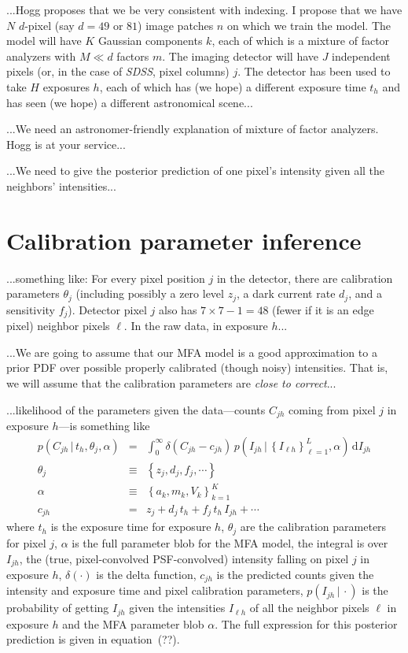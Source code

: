 \documentclass[12pt]{article}
\newcommand{\equationname}{equation}
\newcommand{\project}[1]{\textsl{#1}}
\newcommand{\given}{\,|\,}
\newcommand{\setofall}[1]{\left\{{#1}\right\}}
\newcommand{\dd}{\mathrm{d}}
\begin{document}
...Hogg proposes that we be very consistent with indexing.  I propose
that we have $N$ $d$-pixel (say $d=49$ or $81$) image patches $n$ on
which we train the model.  The model will have $K$ Gaussian components
$k$, each of which is a mixture of factor analyzers with $M\ll d$
factors $m$.  The imaging detector will have $J$ independent pixels
(or, in the case of \project{SDSS}, pixel columns) $j$.  The detector
has been used to take $H$ exposures $h$, each of which has (we hope) a
different exposure time $t_h$ and has seen (we hope) a different
astronomical scene...

...We need an astronomer-friendly explanation of mixture of factor
analyzers.  Hogg is at your service...

...We need to give the posterior prediction of one pixel's intensity
given all the neighbors' intensities...

\section{Calibration parameter inference}

...something like: For every pixel position $j$ in the detector, there
are calibration parameters $\theta_j$ (including possibly a zero level
$z_j$, a dark current rate $d_j$, and a sensitivity $f_j$).  Detector
pixel $j$ also has $7\times 7-1=48$ (fewer if it is an edge pixel)
neighbor pixels $\ell$.  In the raw data, in exposure $h$...

...We are going to assume that our MFA model is a good approximation
to a prior PDF over possible properly calibrated (though noisy)
intensities.  That is, we will assume that the calibration parameters
are \emph{close to correct}...

...likelihood of the parameters given the data---counts $C_{jh}$
coming from pixel $j$ in exposure $h$---is something like
\begin{eqnarray}
p(C_{jh}\given t_h,\theta_j,\alpha) &=& \int_0^\infty \delta(C_{jh} - c_{jh})\,p(I_{jh}\given\setofall{I_{\ell h}}_{\ell=1}^L,\alpha)\,\dd I_{jh}
\label{eq:calibration}\\
\theta_j &\equiv& \setofall{z_j, d_j, f_j, \cdots}
\\
\alpha &\equiv& \setofall{a_k,m_k,V_k}_{k=1}^K
\\
c_{jh} &=& z_j + d_j\,t_h + f_j\,t_h\,I_{jh} + \cdots
\end{eqnarray}
where $t_h$ is the exposure time for exposure $h$, $\theta_j$ are the
calibration parameters for pixel $j$, $\alpha$ is the full parameter
blob for the MFA model, the integral is over $I_{jh}$, the (true,
pixel-convolved PSF-convolved) intensity falling on pixel $j$ in
exposure $h$, $\delta(\cdot)$ is the delta function, $c_{jh}$ is the
predicted counts given the intensity and exposure time and pixel
calibration parameters, $p(I_{jh}\given\cdot)$ is the probability of
getting $I_{jh}$ given the intensities $I_{\ell h}$ of all the
neighbor pixels $\ell$ in exposure $h$ and the MFA parameter blob
$\alpha$.  The full expression for this posterior prediction is given
in \equationname~(??).
\end{document}
